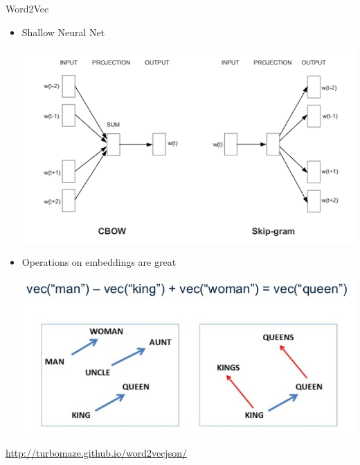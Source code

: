 \documentclass{beamer}
\begin{document}
\begin{frame}{Word2Vec}
	\begin{itemize}
		\pause\item Shallow Neural Net
				\begin{center}
					\includegraphics[scale=0.2]{img/w2vv}
				\end{center}
				
		\pause\item Operations on embeddings are great
		\begin{center}
			\includegraphics[scale=0.5]{img/w2v}
		\end{center}
		
	\end{itemize}
	\pause\href{http://turbomaze.github.io/word2vecjson/}{http://turbomaze.github.io/word2vecjson/}
\end{frame}
\end{document}
